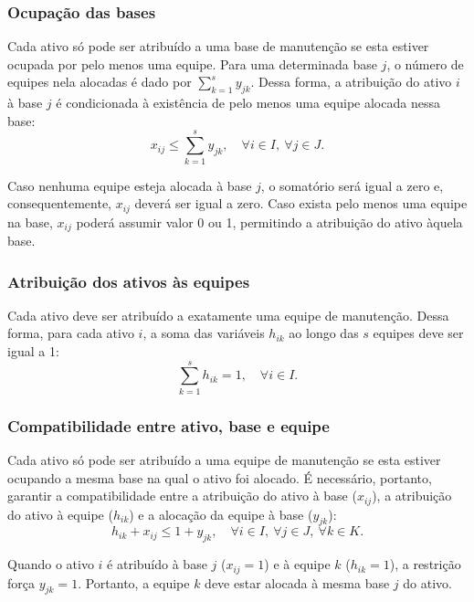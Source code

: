 \documentclass[conference]{IEEEtran}
\begin{document}
\subsubsection{Ocupação das bases}
Cada ativo só pode ser atribuído a uma base de manutenção se esta estiver ocupada por pelo menos uma equipe. Para uma determinada base $j$, o número de equipes nela alocadas é dado por $\sum_{k=1}^{s} y_{jk}$. Dessa forma, a atribuição do ativo $i$ à base $j$ é condicionada à existência de pelo menos uma equipe alocada nessa base:
\begin{equation}
x_{ij} \le \sum_{k=1}^{s} y_{jk}, \quad \forall i \in I,\ \forall j \in J.
\label{eq:r3}
\end{equation}

Caso nenhuma equipe esteja alocada à base $j$, o somatório será igual a zero e, consequentemente, $x_{ij}$ deverá ser igual a zero. Caso exista pelo menos uma equipe na base, $x_{ij}$ poderá assumir valor 0 ou 1, permitindo a atribuição do ativo àquela base.

\subsubsection{Atribuição dos ativos às equipes}
Cada ativo deve ser atribuído a exatamente uma equipe de manutenção. Dessa forma, para cada ativo $i$, a soma das variáveis $h_{ik}$ ao longo das $s$ equipes deve ser igual a 1:
\begin{equation}
\sum_{k=1}^{s} h_{ik} = 1, \quad \forall i \in I.
\label{eq:r4}
\end{equation}

\subsubsection{Compatibilidade entre ativo, base e equipe}
Cada ativo só pode ser atribuído a uma equipe de manutenção se esta estiver ocupando a mesma base na qual o ativo foi alocado. É necessário, portanto, garantir a compatibilidade entre a atribuição do ativo à base ($x_{ij}$), a atribuição do ativo à equipe ($h_{ik}$) e a alocação da equipe à base ($y_{jk}$):
\begin{equation}
h_{ik} + x_{ij} \le 1 + y_{jk}, \quad \forall i \in I,\ \forall j \in J,\ \forall k \in K.
\label{eq:r5}
\end{equation}

Quando o ativo $i$ é atribuído à base $j$ ($x_{ij} = 1$) e à equipe $k$ ($h_{ik} = 1$), a restrição força $y_{jk} = 1$. Portanto, a equipe $k$ deve estar alocada à mesma base $j$ do ativo.
\end{document}
